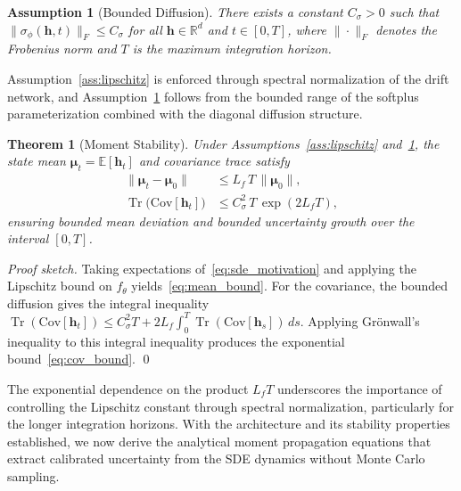 \documentclass[journal]{IEEEtran}
\newcommand{\R}{\mathbb{R}}
\newcommand{\E}{\mathbb{E}}
\DeclareMathOperator{\Tr}{Tr}
\newtheorem{theorem}{Theorem}
\newtheorem{assumption}{Assumption}
\begin{document}
\begin{assumption}[Bounded Diffusion]
\label{ass:diffusion}
There exists a constant $C_\sigma > 0$ such that $\|\sigma_\phi(\mathbf{h}, t)\|_F \le C_\sigma$ for all $\mathbf{h} \in \R^d$ and $t \in [0, T]$, where $\|\cdot\|_F$ denotes the Frobenius norm and $T$ is the maximum integration horizon.
\end{assumption}

Assumption~\ref{ass:lipschitz} is enforced through spectral normalization of the drift network, and Assumption~\ref{ass:diffusion} follows from the bounded range of the softplus parameterization combined with the diagonal diffusion structure.

\begin{theorem}[Moment Stability]
\label{thm:stability}
Under Assumptions~\ref{ass:lipschitz} and~\ref{ass:diffusion}, the state mean $\boldsymbol{\mu}_t = \E[\mathbf{h}_t]$ and covariance trace satisfy
\begin{align}
\|\boldsymbol{\mu}_t - \boldsymbol{\mu}_0\| &\le L_f \, T \, \|\boldsymbol{\mu}_0\|, \label{eq:mean_bound} \\
\Tr\!\big(\mathrm{Cov}[\mathbf{h}_t]\big) &\le C_\sigma^2 \, T \, \exp(2 L_f T), \label{eq:cov_bound}
\end{align}
ensuring bounded mean deviation and bounded uncertainty growth over the interval $[0, T]$.
\end{theorem}

\begin{proof}[Proof sketch]
Taking expectations of~\eqref{eq:sde_motivation} and applying the Lipschitz bound on $f_\theta$ yields~\eqref{eq:mean_bound}. For the covariance, the bounded diffusion gives the integral inequality $\Tr(\mathrm{Cov}[\mathbf{h}_t]) \le C_\sigma^2 T + 2 L_f \int_0^T \Tr(\mathrm{Cov}[\mathbf{h}_s])\,ds$. Applying Gr\"{o}nwall's inequality to this integral inequality produces the exponential bound~\eqref{eq:cov_bound}. \qed
\end{proof}

The exponential dependence on the product $L_f T$ underscores the importance of controlling the Lipschitz constant through spectral normalization, particularly for the longer integration horizons. With the architecture and its stability properties established, we now derive the analytical moment propagation equations that extract calibrated uncertainty from the SDE dynamics without Monte Carlo sampling.


\end{document}
